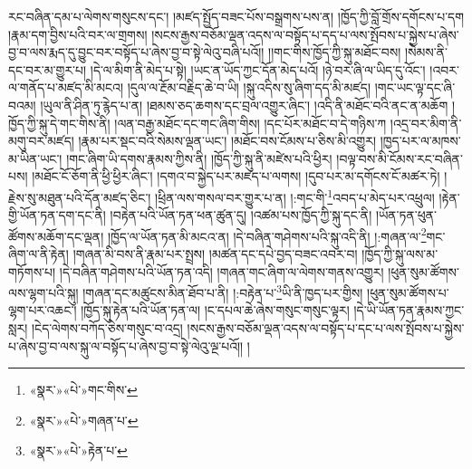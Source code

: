 རང་བཞིན་དམ་པ་ལེགས་གསུངས་དང་། །མཛད་སྤྱོད་བཟང་པོས་བསྒྲགས་པས་ན། །ཁྱོད་ཀྱི་བློ་གྲོས་དགོངས་པ་དག །རྣམ་དག་བྱིས་པའི་བར་ལ་གྲགས། །སངས་རྒྱས་བཅོམ་ལྡན་འདས་ལ་བསྟོད་པ་དད་པ་ལས་སྤོབས་པ་སྐྱེས་པ་ཞེས་བྱ་བ་ལས་རྨད་དུ་བྱུང་བར་བསྟོད་པ་ཞེས་བྱ་བ་སྟེ་ལེའུ་བཞི་པའོ།། །།གང་གིས་ཁྱོད་ཀྱི་སྐུ་མཐོང་བས། །སེམས་ནི་དང་བར་མ་གྱུར་པ། །དེ་ལ་མིག་ནི་མེད་པ་སྟེ། །ཡང་ན་ཡོད་ཀྱང་དོན་མེད་པའོ། །ཉེ་བར་ཞི་ལ་ཡིད་དུ་འོང་། །འབར་ལ་གནོད་པ་མཛད་མི་མངའ། །དུལ་ལ་རྔོམ་བརྗིད་ཆེ་བ་ཡི། །སྐུ་འདིས་སུ་ཞིག་དད་མི་མཛད། །གང་ཡང་ལྟ་དང་ཞི་བའམ། །ཡུལ་ནི་ཤིན་ཏུ་རྙེད་པ་ན། །ཐམས་ཅད་ཆགས་དང་བྲལ་འགྱུར་ཞིང་། །འདི་ནི་མཐོང་བའི་ནང་ན་མཆོག །ཁྱོད་ཀྱི་སྐུ་དེ་གང་གིས་ནི། །ལན་བརྒྱ་མཐོང་དང་གང་ཞིག་གིས། །དང་པོར་མཐོང་བ་དེ་གཉིས་ཀ །འདྲ་བར་མིག་ནི་མགུ་བར་མཛད། །རྣམ་པར་སྡང་བའི་སེམས་ལྡན་ཡང་། །མཐོང་བས་ངོམས་པ་ཅིས་མི་འགྱུར། །ཁྱད་པར་ལ་མཁས་མ་ཡིན་ཡང་། །གང་ཞིག་ཡི་དགས་རྣམས་ཀྱིས་ནི། །ཁྱོད་ཀྱི་སྐུ་ནི་མཛེས་པའི་ཕྱིར། །བལྟ་བས་མི་ངོམས་རང་བཞིན་པས། །མཐོང་ངོ་ཅོག་ནི་ཕྱི་ཕྱིར་ཞིང་། །དགའ་བ་སྐྱེད་པར་མཛད་པ་ལགས། །དུབ་པར་མ་དགོངས་ངོ་མཚར་ཏེ། །རྗེས་སུ་མཐུན་པའི་དོན་མཛད་ཅིང་། །ཕྲིན་ལས་གསལ་བར་གྱུར་པ་ན། །:གང་གི་\footnote{«སྣར་»«པེ་»གང་གིས་}འབད་པ་མེད་པར་འཕྲུལ། །རྟེན་གྱི་ཡོན་ཏན་དག་དང་ནི། །བརྟེན་པའི་ཡོན་ཏན་ཕན་ཚུན་དུ། །འཚམ་པས་ཁྱོད་ཀྱི་སྐུ་དང་ནི། །ཡོན་ཏན་ཕུན་ཚོགས་མཆོག་དང་ལྡན། །ཁྱོད་ལ་ཡོན་ཏན་མི་མངའ་ན། །དེ་བཞིན་གཤེགས་པའི་སྐུ་འདི་ནི། །:གཞན་ལ་\footnote{«སྣར་»«པེ་»གཞན་པ་}གང་ཞིག་ལ་ནི་རྟེན། །གཞན་མི་བས་ནི་རྣམ་པར་སྤྲས། །མཚན་དང་དཔེ་བྱད་བཟང་འབར་བ། །ཁྱོད་ཀྱི་སྐུ་ལས་མ་གཏོགས་པ། །དེ་བཞིན་གཤེགས་པའི་ཡོན་ཏན་འདི། །གཞན་གང་ཞིག་ལ་ལེགས་གནས་འགྱུར། །ཕུན་སུམ་ཚོགས་ལས་ལྷག་པའི་སྐུ། །གཞན་དང་མཚུངས་མིན་ཐོབ་པ་ནི། །:བརྟེན་པ་\footnote{«སྣར་»«པེ་»རྟེན་པ་}ཡི་ནི་ཁྱད་པར་གྱིས། །ཕུན་སུམ་ཚོགས་པ་ལྷག་པར་འཆང་། །ཁྱོད་སྐུ་རྟེན་པའི་ཡོན་ཏན་ལ། །ང་དཔལ་ཆེ་ཞེས་གསུང་གསུང་ལྟར། །དེ་ཡི་ཡོན་ཏན་རྣམས་ཀྱང་སླར། །ངེད་ལེགས་བཀོད་ཅེས་གསུང་བ་འདྲ། །སངས་རྒྱས་བཅོམ་ལྡན་འདས་ལ་བསྟོད་པ་དང་པ་ལས་སྤོབས་པ་སྐྱེས་པ་ཞེས་བྱ་བ་ལས་སྐུ་ལ་བསྟོད་པ་ཞེས་བྱ་བ་སྟེ་ལེའུ་ལྔ་པའོ།། །
